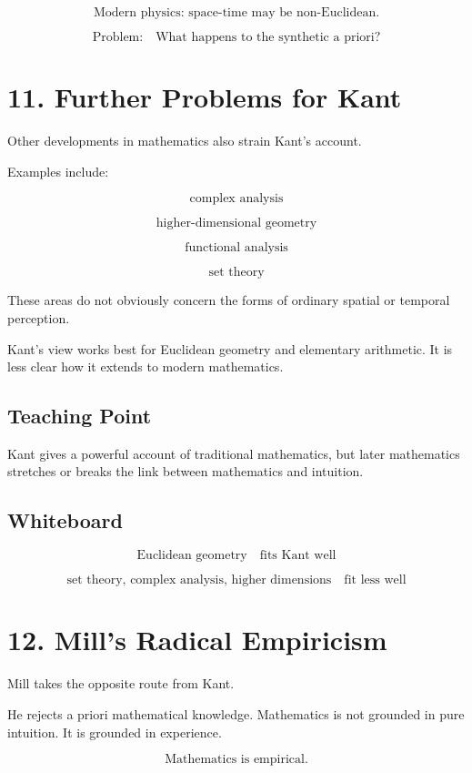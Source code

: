 \documentclass[11pt]{article}
\begin{document}
\[
\text{Modern physics: space-time may be non-Euclidean.}
\]

\[
\text{Problem:}
\quad
\text{What happens to the synthetic a priori?}
\]

\section*{11. Further Problems for Kant}

Other developments in mathematics also strain Kant's account.

Examples include:

\[
\text{complex analysis}
\]

\[
\text{higher-dimensional geometry}
\]

\[
\text{functional analysis}
\]

\[
\text{set theory}
\]

These areas do not obviously concern the forms of ordinary spatial or temporal
perception.

Kant's view works best for Euclidean geometry and elementary arithmetic. It is less clear
how it extends to modern mathematics.

\subsection*{Teaching Point}

Kant gives a powerful account of traditional mathematics, but later mathematics stretches
or breaks the link between mathematics and intuition.

\subsection*{Whiteboard}

\[
\text{Euclidean geometry}
\quad \text{fits Kant well}
\]

\[
\text{set theory, complex analysis, higher dimensions}
\quad
\text{fit less well}
\]

\section*{12. Mill's Radical Empiricism}

Mill takes the opposite route from Kant.

He rejects a priori mathematical knowledge. Mathematics is not grounded in pure
intuition. It is grounded in experience.

\[
\boxed{
\text{Mathematics is empirical.}
}
\]
\end{document}
